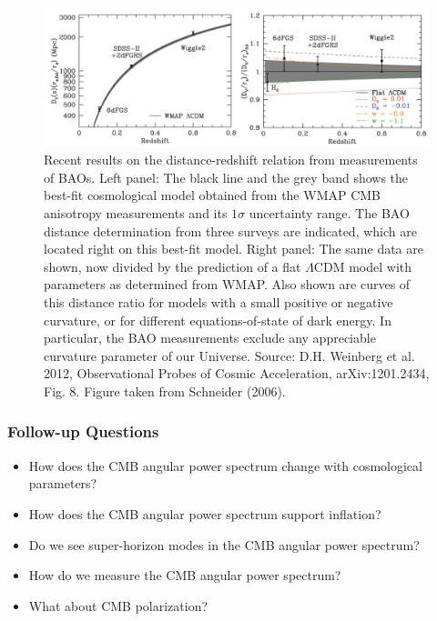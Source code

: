 \documentclass[a4paper,11pt]{article}
\begin{document}
\begin{figure}[t]
    \includegraphics[width=16cm]{figures/BAOs.png}
    \centering
    \caption{\footnotesize{Recent results on the distance-redshift relation from measurements of BAOs. Left panel: The black line and the grey band shows the best-fit cosmological model obtained from the WMAP CMB anisotropy measurements and its $1\sigma$  uncertainty range. The BAO distance determination from three surveys are indicated, which are located right on this best-fit model. Right panel: The same data are shown, now divided by the prediction of a flat $\Lambda$CDM model with parameters as determined from WMAP. Also shown are curves of this distance ratio for models with a small positive or negative curvature, or for different equations-of-state of dark energy. In particular, the BAO measurements exclude any appreciable curvature parameter of our Universe. Source: D.H. Weinberg et al. 2012, Observational Probes of Cosmic Acceleration, arXiv:1201.2434, Fig. 8. Figure taken from Schneider (2006).}}
    \label{fig:BAOs}
\end{figure}

\newpage
\subsubsection{Follow-up Questions}

\begin{itemize}
    \item How does the CMB angular power spectrum change with cosmological parameters?
    \item How does the CMB angular power spectrum support inflation?
    \item Do we see super-horizon modes in the CMB angular power spectrum?
    \item How do we measure the CMB angular power spectrum?
    \item What about CMB polarization?
\end{itemize}


%
%
\end{document}
